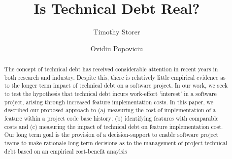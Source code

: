\documentclass[sigconf]{acmart}
\begin{document}
\title{Is Technical Debt Real?}


\author{Timothy Storer}
\email{}

\author{Ovidiu Popoviciu}
\email{}




\begin{abstract}
The concept of technical debt has received considerable attention in 
recent years in both research and industry.  Despite this, there is 
relatively little empirical evidence as to the longer term impact of 
technical debt on a software project.  In our work, we seek to test the 
hypothesis that technical debt incurs work-effort 'interest' in a 
software project, arising through increased feature implementation 
costs.  In this paper, we described our proposed approach to (a) 
measuring the cost of implementation of a feature within a project code 
base history; (b) identifying features with comparable costs and (c) 
measuring the impact of technical debt on feature implementation cost.  
Our long term goal is the provision of a decision-support to enable 
software project teams to make rationale long term decisions as to the 
management of project technical debt based on an empirical cost-benefit 
anaylsis
\end{abstract}

%
%
\end{document}
